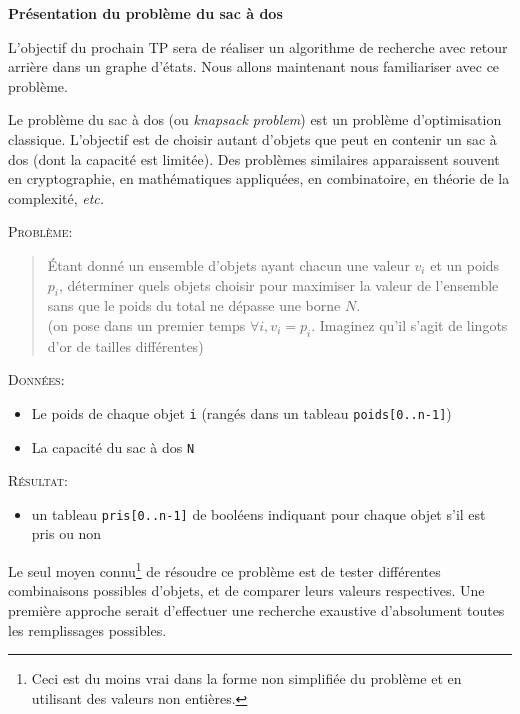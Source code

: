 \documentclass[10pt]{article}\usepackage[correction,nu]{esial}
\begin{document}
\Exercice\textbf{Présentation du problème du sac à dos}

L'objectif du prochain TP sera de réaliser un algorithme de recherche avec
retour arrière dans un graphe d'états. Nous allons maintenant nous familiariser
avec ce problème.

Le problème du sac à dos (ou \textit{knapsack problem}) est un problème
d'optimisation classique. L'objectif est de choisir autant d'objets que peut en
contenir un sac à dos (dont la capacité est limitée). Des problèmes similaires
apparaissent souvent en cryptographie, en mathématiques appliquées, en
combinatoire, en théorie de la complexité, \textit{etc.}
\medskip

\noindent\textsc{Problème:} \vspace{-.2\baselineskip}
\begin{quote}
  Étant donné un ensemble d'objets ayant chacun une valeur $v_i$ et un poids
  $p_i$, déterminer quels objets choisir pour maximiser la
  valeur de l'ensemble sans que le poids du total ne dépasse une borne $N$.\\
  (on pose dans un premier temps $\forall i, v_i=p_i$. Imaginez qu'il s'agit de
  lingots d'or de tailles différentes)
\end{quote}


\textsc{Données}:
\begin{itemize}
\item Le poids de chaque objet \texttt{i} (rangés dans un tableau
  \texttt{poids[0..n-1]})
\item La capacité du sac à dos \texttt{N}
\end{itemize}

\textsc{Résultat}:
\begin{itemize}
\item un tableau \texttt{pris[0..n-1]} de booléens indiquant pour chaque objet
  s'il est pris ou non
\end{itemize}

\medskip Le seul moyen connu\footnote{Ceci est du moins vrai dans la forme non
  simplifiée du problème et en utilisant des valeurs non entières.
  } de résoudre ce problème est de tester différentes combinaisons
possibles d'objets, et de comparer leurs valeurs respectives.  Une première
approche serait d'effectuer une recherche exaustive d'absolument toutes les
remplissages possibles.
\end{document}
